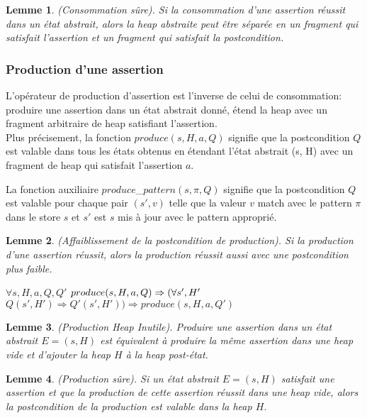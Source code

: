 \documentclass[9pt,openany]{book}
\newtheorem{lemme}{Lemme}
\begin{document}
	\begin{lemme}
		(Consommation s\^ure). Si la consommation d'une assertion r\'eussit dans un \'etat abstrait, alors la heap abstraite peut \^etre s\'epar\'ee en un fragment qui satisfait l'assertion et un fragment qui satisfait la postcondition.
	\end{lemme}
			\subsubsection{Production d'une assertion}
		L'op\'erateur de production d'assertion est l'inverse de celui de consommation: produire une assertion dans un \'etat abstrait donn\'e, \'etend la heap avec un fragment arbitraire de heap satisfiant l'assertion.\\
		Plus pr\'ecisement, la fonction $produce(s,H,a,Q)$ signifie que la postcondition $Q$ est valable  dans tous les \'etats obtenus en \'etendant l'\'etat abstrait (s, H) avec un fragment de heap qui satisfait l'assertion $a$.\par
		La fonction auxiliaire $produce$_$pattern(s,\pi,Q)$ signifie que la postcondition $Q$ est valable pour chaque pair $(s',v)$ telle que la valeur $v$ match avec le pattern $\pi$ dans le store $s$ et $s'$ est $s$ mis \`a jour avec le pattern appropri\'e.\par 
		\begin{lemme}
			(Affaiblissement de la postcondition de production). Si la production d'une assertion r\'eussit, alors la production r\'eussit aussi avec une postcondition plus faible.\par
$\forall s,H,a,Q,Q'$ $produce(s,H,a,Q)\Rightarrow\\(\forall s', H'$ $Q(s',H')\Rightarrow Q'(s',H'))\Rightarrow produce(s,H,a,Q')$
		\end{lemme}	
		
		\begin{lemme}
		(Production Heap Inutile). Produire une assertion dans un \'etat abstrait $E = (s,H)$  est \'equivalent \`a produire la m\^eme assertion dans une heap vide et d'ajouter la heap $H$ \`a la heap post-\'etat.
		\end{lemme}
	
		\begin{lemme}
		(Production s\^ure). Si un \'etat abstrait $E=(s,H)$ satisfait une assertion et que la production de cette assertion r\'eussit dans une heap vide, alors la postcondition de la production est valable dans la heap $H$.
		\end{lemme}
\end{document}
